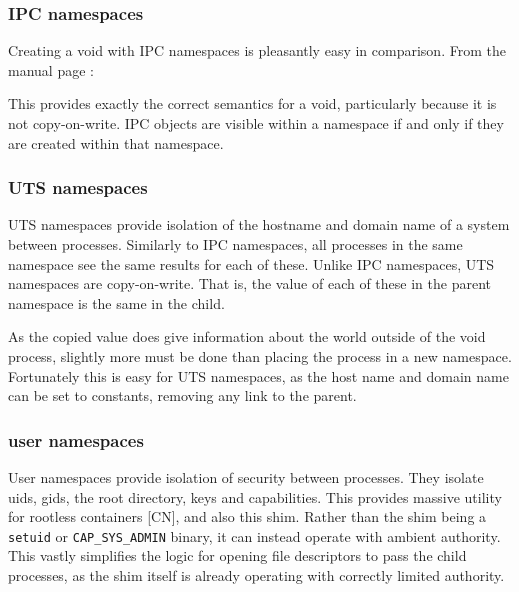 \documentclass[sigplan]{acmart}
\begin{document}
\subsubsection{IPC namespaces}

Creating a void with IPC namespaces is pleasantly easy in comparison. From the manual page \citep{free_software_foundation_ipc_namespaces7_2021}:


This provides exactly the correct semantics for a void, particularly because it is not copy-on-write. IPC objects are visible within a namespace if and only if they are created within that namespace.

\subsubsection{UTS namespaces}

UTS namespaces provide isolation of the hostname and domain name of a system between processes. Similarly to IPC namespaces, all processes in the same namespace see the same results for each of these. Unlike IPC namespaces, UTS namespaces are copy-on-write. That is, the value of each of these in the parent namespace is the same in the child.

As the copied value does give information about the world outside of the void process, slightly more must be done than placing the process in a new namespace. Fortunately this is easy for UTS namespaces, as the host name and domain name can be set to constants, removing any link to the parent.

\subsubsection{user namespaces}

User namespaces provide isolation of security between processes. They isolate uids, gids, the root directory, keys and capabilities. This provides massive utility for rootless containers [CN], and also this shim. Rather than the shim being a \texttt{setuid} or \texttt{CAP\_SYS\_ADMIN} binary, it can instead operate with ambient authority. This vastly simplifies the logic for opening file descriptors to pass the child processes, as the shim itself is already operating with correctly limited authority.
\end{document}
